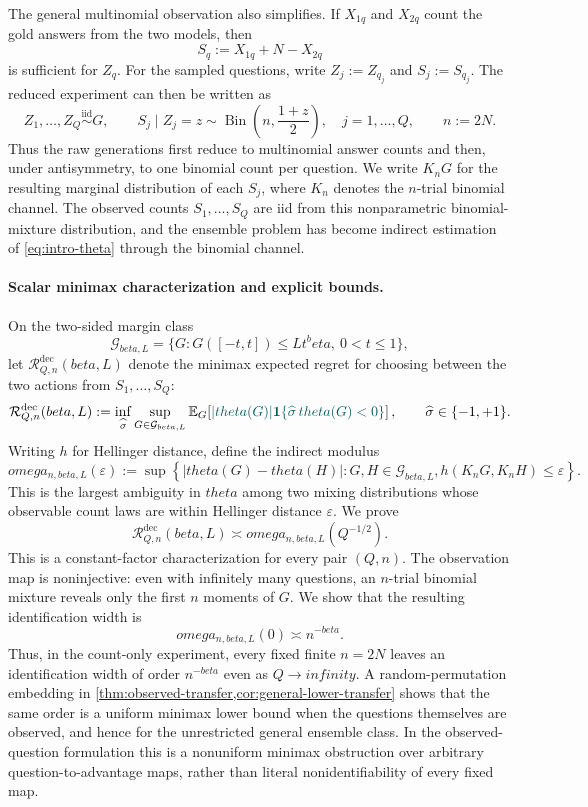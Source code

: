 \documentclass[11pt]{article}
\def\beta{beta}%
\def\theta{theta}%
\def\omega{omega}%
\def\infty{infinity}%
\newcommand{\E}{\mathbb E}
\newcommand{\one}{\mathbf 1}
\newcommand{\Bin}{\operatorname{Bin}}
\newcommand{\calG}{\mathcal G}
\newcommand{\calR}{\mathcal R}
\newcommand{\eps}{\varepsilon}
\newcommand\ced[1]{{\color{teal!70!black} #1}}
\begin{document}
The general multinomial observation also simplifies.  If $X_{1q}$ and $X_{2q}$ count the gold answers from the two models, then
\[
S_q:=X_{1q}+N-X_{2q}
\]
is sufficient for $Z_q$.  For the sampled questions, write $Z_j:=Z_{q_j}$ and $S_j:=S_{q_j}$.  The reduced experiment can then be written as
\begin{equation}
\label{eq:intro-binomial-channel}
Z_1,\ldots,Z_Q\overset{\mathrm{iid}}{\sim}G,
\qquad
S_j\mid Z_j=z
\sim
\Bin\left(n,\frac{1+z}{2}\right),
\quad j=1,\ldots,Q,
\qquad n:=2N.
\end{equation}
Thus the raw generations first reduce to multinomial answer counts and then, under antisymmetry, to one binomial count per question.  We write $K_nG$ for the resulting marginal distribution of each $S_j$, where $K_n$ denotes the $n$-trial binomial channel.  The observed counts $S_1,\ldots,S_Q$ are iid from this nonparametric binomial-mixture distribution, and the ensemble problem has become indirect estimation of \eqref{eq:intro-theta} through the binomial channel.

\paragraph{Scalar minimax characterization and explicit bounds.}
On the two-sided margin class
\[
\calG_{\beta,L}
=
\{G:G([-t,t])\le Lt^\beta,\ 0<t\le1\},
\]
let $\calR^{\mathrm{dec}}_{Q,n}(\beta,L)$ denote the minimax expected regret for choosing between the two actions from $S_1,\ldots,S_Q$:
\[
\calR^{\mathrm{dec}}_{Q,n}(\beta,L)
:=
\inf_{\widehat\sigma}
\sup_{G\in\calG_{\beta,L}}
\E_G\!\left[
\ced{|\theta(G)|
\one\{\widehat\sigma\,\theta(G)<0\}}
\right],
\qquad \widehat\sigma\in\{-1,+1\}.
\]
Writing $h$ for Hellinger distance, define the indirect modulus
\[
\omega_{n,\beta,L}(\eps)
:=
\sup\left\{
|\theta(G)-\theta(H)|:
G,H\in\calG_{\beta,L},
h(K_nG,K_nH)\le\eps
\right\}.
\]
This is the largest ambiguity in $\theta$ among two mixing distributions whose observable count laws are within Hellinger distance $\eps$.  We prove %
\begin{equation}
\label{eq:intro-modulus}
\calR^{\mathrm{dec}}_{Q,n}(\beta,L)
\asymp
\omega_{n,\beta,L}(Q^{-1/2}).
\end{equation}
This is a constant-factor characterization for every pair $(Q,n)$.  The observation map is noninjective: even with infinitely many questions, an $n$-trial binomial mixture reveals only the first $n$ moments of $G$.  We show that the resulting identification width is
\begin{equation}
\label{eq:intro-floor}
\omega_{n,\beta,L}(0)
\asymp
n^{-\beta}.
\end{equation}
Thus, in the count-only experiment, every fixed finite $n=2N$ leaves an identification width of order $n^{-\beta}$ even as $Q\to\infty$.  A random-permutation embedding in \cref{thm:observed-transfer,cor:general-lower-transfer} shows that the same order is a uniform minimax lower bound when the questions themselves are observed, and hence for the unrestricted general ensemble class.  In the observed-question formulation this is a nonuniform minimax obstruction over arbitrary question-to-advantage maps, rather than literal nonidentifiability of every fixed map.
\end{document}
